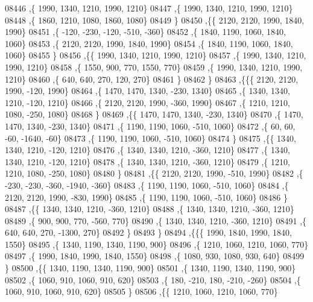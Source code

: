\begin{DoxyCode}
08446     ,\{  1990,  1340,  1210,  1990,  1210\}
08447     ,\{  1990,  1340,  1210,  1990,  1210\}
08448     ,\{  1860,  1210,  1080,  1860,  1080\}
08449     \}
08450    ,\{\{  2120,  2120,  1990,  1840,  1990\}
08451     ,\{  -120,  -230,  -120,  -510,  -360\}
08452     ,\{  1840,  1190,  1060,  1840,  1060\}
08453     ,\{  2120,  2120,  1990,  1840,  1990\}
08454     ,\{  1840,  1190,  1060,  1840,  1060\}
08455     \}
08456    ,\{\{  1990,  1340,  1210,  1990,  1210\}
08457     ,\{  1990,  1340,  1210,  1990,  1210\}
08458     ,\{  1550,   900,   770,  1550,   770\}
08459     ,\{  1990,  1340,  1210,  1990,  1210\}
08460     ,\{   640,   640,   270,   120,   270\}
08461     \}
08462    \}
08463   ,\{\{\{  2120,  2120,  1990,  -120,  1990\}
08464     ,\{  1470,  1470,  1340,  -230,  1340\}
08465     ,\{  1340,  1340,  1210,  -120,  1210\}
08466     ,\{  2120,  2120,  1990,  -360,  1990\}
08467     ,\{  1210,  1210,  1080,  -250,  1080\}
08468     \}
08469    ,\{\{  1470,  1470,  1340,  -230,  1340\}
08470     ,\{  1470,  1470,  1340,  -230,  1340\}
08471     ,\{  1190,  1190,  1060,  -510,  1060\}
08472     ,\{    60,    60,   -60, -1640,   -60\}
08473     ,\{  1190,  1190,  1060,  -510,  1060\}
08474     \}
08475    ,\{\{  1340,  1340,  1210,  -120,  1210\}
08476     ,\{  1340,  1340,  1210,  -360,  1210\}
08477     ,\{  1340,  1340,  1210,  -120,  1210\}
08478     ,\{  1340,  1340,  1210,  -360,  1210\}
08479     ,\{  1210,  1210,  1080,  -250,  1080\}
08480     \}
08481    ,\{\{  2120,  2120,  1990,  -510,  1990\}
08482     ,\{  -230,  -230,  -360, -1940,  -360\}
08483     ,\{  1190,  1190,  1060,  -510,  1060\}
08484     ,\{  2120,  2120,  1990,  -830,  1990\}
08485     ,\{  1190,  1190,  1060,  -510,  1060\}
08486     \}
08487    ,\{\{  1340,  1340,  1210,  -360,  1210\}
08488     ,\{  1340,  1340,  1210,  -360,  1210\}
08489     ,\{   900,   900,   770,  -560,   770\}
08490     ,\{  1340,  1340,  1210,  -360,  1210\}
08491     ,\{   640,   640,   270, -1300,   270\}
08492     \}
08493    \}
08494   ,\{\{\{  1990,  1840,  1990,  1840,  1550\}
08495     ,\{  1340,  1190,  1340,  1190,   900\}
08496     ,\{  1210,  1060,  1210,  1060,   770\}
08497     ,\{  1990,  1840,  1990,  1840,  1550\}
08498     ,\{  1080,   930,  1080,   930,   640\}
08499     \}
08500    ,\{\{  1340,  1190,  1340,  1190,   900\}
08501     ,\{  1340,  1190,  1340,  1190,   900\}
08502     ,\{  1060,   910,  1060,   910,   620\}
08503     ,\{   180,  -210,   180,  -210,  -260\}
08504     ,\{  1060,   910,  1060,   910,   620\}
08505     \}
08506    ,\{\{  1210,  1060,  1210,  1060,   770\}

\end{DoxyCode}
